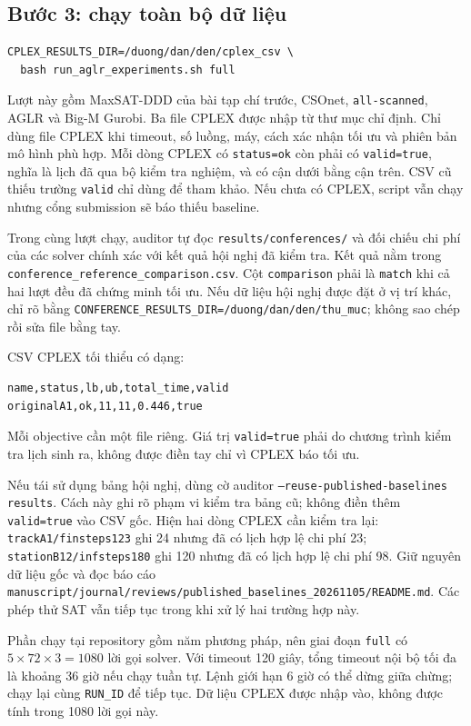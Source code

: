 \documentclass[11pt,a4paper]{article}
\newcommand{\code}[1]{\texttt{#1}}
\newcommand{\file}[1]{\nolinkurl{#1}}
\begin{document}
\subsection{Bước 3: chạy toàn bộ dữ liệu}

\begin{verbatim}
CPLEX_RESULTS_DIR=/duong/dan/den/cplex_csv \
  bash run_aglr_experiments.sh full
\end{verbatim}

Lượt này gồm MaxSAT-DDD của bài tạp chí trước, CSOnet, \code{all-scanned}, AGLR
và Big-M Gurobi. Ba file CPLEX được nhập từ thư mục chỉ định. Chỉ dùng file CPLEX
khi timeout, số luồng, máy, cách xác nhận tối ưu và phiên bản mô hình phù hợp.
Mỗi dòng CPLEX có \code{status=ok} còn phải có \code{valid=true}, nghĩa là lịch đã
qua bộ kiểm tra nghiệm, và có cận dưới bằng cận trên. CSV cũ thiếu trường
\code{valid} chỉ dùng để tham khảo.
Nếu chưa có CPLEX, script vẫn chạy nhưng cổng submission sẽ báo thiếu baseline.

Trong cùng lượt chạy, auditor tự đọc \file{results/conferences/} và đối chiếu
chi phí của các solver chính xác với kết quả hội nghị đã kiểm tra. Kết quả nằm
trong \file{conference_reference_comparison.csv}. Cột \code{comparison} phải là
\code{match} khi cả hai lượt đều đã chứng minh tối ưu. Nếu dữ liệu hội nghị
được đặt ở vị trí khác, chỉ rõ bằng
\file{CONFERENCE_RESULTS_DIR=/duong/dan/den/thu_muc}; không sao chép rồi sửa
file bằng tay.

CSV CPLEX tối thiểu có dạng:

\begin{verbatim}
name,status,lb,ub,total_time,valid
originalA1,ok,11,11,0.446,true
\end{verbatim}

Mỗi objective cần một file riêng. Giá trị \code{valid=true} phải do chương
trình kiểm tra lịch sinh ra, không được điền tay chỉ vì CPLEX báo tối ưu.

Nếu tái sử dụng bảng hội nghị, dùng cờ auditor
\code{--reuse-published-baselines results}. Cách này ghi rõ phạm vi kiểm tra
bảng cũ; không điền thêm \code{valid=true} vào CSV gốc. Hiện hai dòng CPLEX
cần kiểm tra lại: \code{trackA1/finsteps123} ghi 24 nhưng đã có lịch hợp lệ
chi phí 23; \code{stationB12/infsteps180} ghi 120 nhưng đã có lịch hợp lệ
chi phí 98. Giữ nguyên dữ liệu gốc và đọc báo cáo
\file{manuscript/journal/reviews/published_baselines_20261105/README.md}.
Các phép thử SAT vẫn tiếp tục trong khi xử lý hai trường hợp này.

Phần chạy tại repository gồm năm phương pháp, nên giai đoạn \code{full} có
$5\times72\times3=1080$ lời gọi solver. Với timeout 120 giây, tổng timeout nội
bộ tối đa là khoảng 36 giờ nếu chạy tuần tự. Lệnh giới hạn 6 giờ có thể dừng
giữa chừng; chạy lại cùng \code{RUN\_ID} để tiếp tục. Dữ liệu CPLEX được nhập vào, không
được tính trong 1080 lời gọi này.
\end{document}
